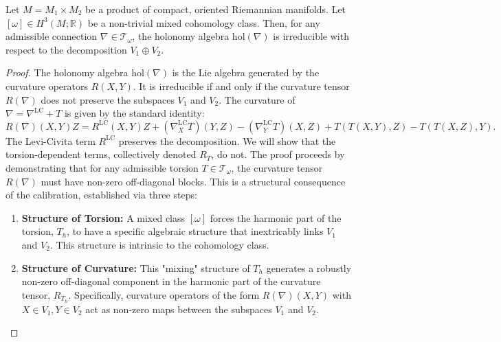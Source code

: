 \documentclass[10pt,a4paper]{amsart}
\begin{document}
\begin{theorem} \label{thm:main}
Let $M = M_1 \times M_2$ be a product of compact, oriented Riemannian manifolds. Let $[\omega] \in H^3(M; \mathbb{R})$ be a non-trivial mixed cohomology class. Then, for any admissible connection $\nabla \in \mathcal{T}_\omega$, the holonomy algebra $\mathrm{hol}(\nabla)$ is irreducible with respect to the decomposition $V_1 \oplus V_2$.
\end{theorem}

\begin{proof}
The holonomy algebra $\mathrm{hol}(\nabla)$ is the Lie algebra generated by the curvature operators $R(X,Y)$. It is irreducible if and only if the curvature tensor $R(\nabla)$ does not preserve the subspaces $V_1$ and $V_2$. The curvature of $\nabla = \nabla^{\mathrm{LC}} + T$ is given by the standard identity:
\begin{equation} \label{eq:full_curvature_decomposition}
R(\nabla)(X,Y)Z = R^{\mathrm{LC}}(X,Y)Z + (\nabla^{\mathrm{LC}}_X T)(Y,Z) - (\nabla^{\mathrm{LC}}_Y T)(X,Z) + T(T(X,Y),Z) - T(T(X,Z),Y).
\end{equation}
The Levi-Civita term $R^{\mathrm{LC}}$ preserves the decomposition. We will show that the torsion-dependent terms, collectively denoted $R_T$, do not. The proof proceeds by demonstrating that for any admissible torsion $T \in \mathcal{T}_\omega$, the curvature tensor $R(\nabla)$ must have non-zero off-diagonal blocks. This is a structural consequence of the calibration, established via three steps:
\begin{enumerate}
    \item \textbf{Structure of Torsion:} A mixed class $[\omega]$ forces the harmonic part of the torsion, $T_h$, to have a specific algebraic structure that inextricably links $V_1$ and $V_2$. This structure is intrinsic to the cohomology class.

    \item \textbf{Structure of Curvature:} This "mixing" structure of $T_h$ generates a robustly non-zero off-diagonal component in the harmonic part of the curvature tensor, $R_{T_h}$. Specifically, curvature operators of the form $R(\nabla)(X,Y)$ with $X \in V_1, Y \in V_2$ act as non-zero maps between the subspaces $V_1$ and $V_2$.


\end{enumerate}
\end{proof}
\end{document}
